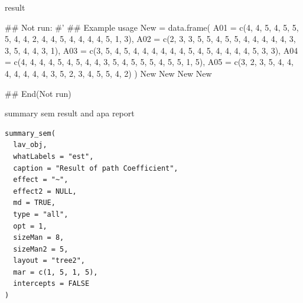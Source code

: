\documentclass[a4paper]{book}
\begin{document}
%
\begin{Value}
result
\end{Value}
%
\begin{Examples}
\begin{ExampleCode}
## Not run: 
#'
## Example usage
New = data.frame(
  A01 = c(4, 4, 5, 4, 5, 5, 5, 4, 4, 2, 4, 4, 5, 4, 4, 4, 4, 5, 1, 3),
  A02 = c(2, 3, 3, 5, 5, 4, 5, 5, 4, 4, 4, 4, 4, 3, 3, 5, 4, 4, 3, 1),
  A03 = c(3, 5, 4, 5, 4, 4, 4, 4, 4, 4, 5, 4, 5, 4, 4, 4, 4, 5, 3, 3),
  A04 = c(4, 4, 4, 4, 5, 4, 5, 4, 4, 3, 5, 4, 5, 5, 5, 4, 5, 5, 1, 5),
  A05 = c(3, 2, 3, 5, 4, 4, 4, 4, 4, 4, 4, 3, 5, 2, 3, 4, 5, 5, 4, 2)
)
New %
New %
New %
New %

## End(Not run)

\end{ExampleCode}
\end{Examples}
%
\begin{Description}
summary sem result and apa report
\end{Description}
%
\begin{Usage}
\begin{verbatim}
summary_sem(
  lav_obj,
  whatLabels = "est",
  caption = "Result of path Coefficient",
  effect = "~",
  effect2 = NULL,
  md = TRUE,
  type = "all",
  opt = 1,
  sizeMan = 8,
  sizeMan2 = 5,
  layout = "tree2",
  mar = c(1, 5, 1, 5),
  intercepts = FALSE
)
\end{verbatim}
\end{Usage}
%
\end{document}
